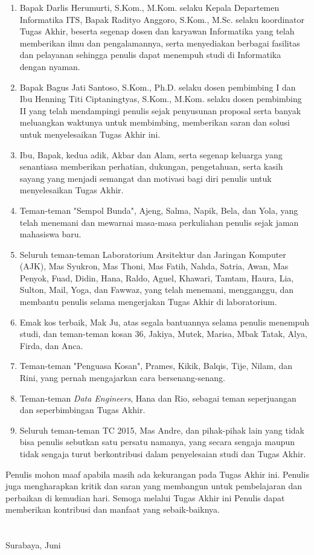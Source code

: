 \begin{enumerate}
	\item Bapak Darlis Herumurti, S.Kom., M.Kom. selaku Kepala Departemen Informatika ITS, Bapak Radityo Anggoro, S.Kom., M.Sc. selaku koordinator Tugas Akhir, beserta segenap dosen dan karyawan Informatika yang telah memberikan ilmu dan pengalamannya, serta menyediakan berbagai fasilitas dan pelayanan sehingga penulis dapat menempuh studi di Informatika dengan nyaman.
	\item Bapak Bagus Jati Santoso, S.Kom., Ph.D. selaku dosen pembimbing I dan Ibu Henning Titi Ciptaningtyas, S.Kom., M.Kom. selaku dosen pembimbing II yang telah mendampingi penulis sejak penyusunan proposal serta banyak meluangkan waktunya untuk membimbing, memberikan saran dan solusi untuk menyelesaikan Tugas Akhir ini.
	\item Ibu, Bapak, kedua adik, Akbar dan Alam, serta segenap keluarga yang senantiasa memberikan perhatian, dukungan, pengetahuan, serta kasih sayang yang menjadi semangat dan motivasi bagi diri penulis untuk menyelesaikan Tugas Akhir.
	\item Teman-teman "Sempol Bunda", Ajeng, Salma, Napik, Bela, dan Yola, yang telah menemani dan mewarnai masa-masa perkuliahan penulis sejak jaman mahasiswa baru.
	\item Seluruh teman-teman Laboratorium Arsitektur dan Jaringan Komputer (AJK), Mas Syukron, Mas Thoni, Mas Fatih, Nahda, Satria, Awan, Mas Penyok, Fuad, Didin, Hana, Raldo, Aguel, Khawari, Tamtam, Haura, Lia, Sulton, Mail, Yoga, dan Fawwaz, yang telah menemani, mengganggu, dan membantu penulis selama mengerjakan Tugas Akhir di laboratorium. 
	\item Emak kos terbaik, Mak Ju, atas segala bantuannya selama penulis menempuh studi, dan teman-teman kosan 36, Jakiya, Mutek, Marisa, Mbak Tatak, Alya, Firda, dan Anca.
	\item Teman-teman "Penguasa Kosan", Prames, Kikik, Balqis, Tije, Nilam, dan Rini, yang pernah mengajarkan cara bersenang-senang.
	\item Teman-teman \textit{Data Engineers}, Hana dan Rio, sebagai teman seperjuangan dan seperbimbingan Tugas Akhir.
	\item Seluruh teman-teman TC 2015, Mas Andre, dan pihak-pihak lain yang tidak bisa penulis sebutkan satu persatu namanya, yang secara sengaja maupun tidak sengaja turut berkontribusi dalam penyelesaian studi dan Tugas Akhir.
\end{enumerate}

\pagebreak
Penulis mohon maaf apabila masih ada kekurangan pada Tugas Akhir ini. Penulis juga mengharapkan kritik dan saran yang membangun untuk pembelajaran dan perbaikan di kemudian hari. Semoga melalui Tugas Akhir ini Penulis dapat memberikan kontribusi dan manfaat yang sebaik-baiknya. \\ \\ \\

\hfill Surabaya, Juni \tahun \\ \\ \\

\hfill \penulis \\
\cleardoublepage
